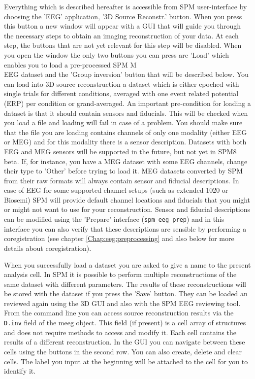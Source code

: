 Everything which is described hereafter is accessible from SPM user-interface by choosing 
the 'EEG' application, '3D Source Reconstr.' button. When you press this button a new window
will appear with a GUI that will guide you through the necessary steps to obtain an imaging
reconstruction of your data. At each step, the buttons that are not yet relevant for this step
will be disabled. When you open the window the only two buttons you can press are 'Load' which enables you
to load a pre-processed SPM M\\EEG dataset and the 'Group inversion' button that will be described below. 
You can load into 3D source reconstruction a dataset which is either epoched with single trials for different
conditions, averaged with one event related potential (ERP) per condition or grand-averaged. An important pre-condition
for loading a dataset is that it should contain sensors and fiducials. This will be checked when you load a file
and loading will fail in case of a problem. You should make sure that the file you are loading
contains channels of only one modality (either EEG or MEG) and for this modality there is a sensor description. 
Datasets with both EEG and MEG sensors will be supported in the future, but not yet in SPM8 beta.
If, for instance, you have a MEG dataset with some EEG channels, change their type to 'Other' before trying to load it.
MEG datasets converted by SPM from their raw formats will always contain
sensor and fiducial descriptions. In case of EEG for some supported channel setups (such as extended 1020 or Biosemi)
SPM will provide default channel locations and fiducials that you might or might not want to use for your reconstruction.
Sensor and fiducial descriptions can be modified using the 'Prepare' interface (\texttt{spm\_eeg\_prep}) and in this
interface you can also verify that these descriptions are sensible by performing a coregistration (see chapter \ref{Chap:eeg:preprocessing} and also below for more details about coregistration). 

When you successfully load a dataset you are asked to give a name to the present analysis cell. In SPM it is possible to
perform multiple reconstructions of the same dataset with different parameters. The results of these reconstructions
will be stored with the dataset if you press the 'Save' button. They can be loaded an reviewed again using
the 3D GUI and also with the SPM EEG reviewing tool. From the command line you can access source reconstruction
results via the \texttt{D.inv} field of the meeg object. This field (if present) is a cell array of structures and does not require
methods to access and modify it. Each cell contains the results of a different reconstruction. In the GUI you
can navigate between these cells using the buttons in the second row. You can also create, delete and clear cells.
The label you input at the beginning will be attached to the cell for you to identify it.



